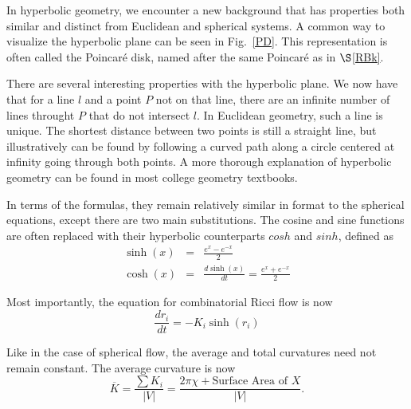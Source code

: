 \documentclass[12pt]{article}
\begin{document}
In hyperbolic geometry, we encounter a new background that has properties both similar and distinct from Euclidean and spherical systems. A common way to visualize the hyperbolic plane can be seen in Fig.~\ref{PD}. This representation is often called the Poincar\'{e} disk, named after the same Poincar\'{e} as in $\S$\ref{RBk}.\newline

\noindent There are several interesting properties with the hyperbolic plane. We now have that for a line $l$ and a point $P$ not on that line, there are an infinite number of lines throught $P$ that do not intersect $l$. In Euclidean geometry, such a line is unique. The shortest distance between two points is still a straight line, but illustratively can be found by following a curved path along a circle centered at infinity going through both points. A more thorough explanation of hyperbolic geometry can be found in most college geometry textbooks.\newline

\noindent In terms of the formulas, they remain relatively similar in format to the spherical equations, except there are two main substitutions. The cosine and sine functions are often replaced with their hyperbolic counterparts $cosh$ and $sinh$, defined as
\begin{eqnarray*}
\sinh(x) &=& \frac{e^x - e^{-x}}{2}\\
\cosh(x) &=& \frac{d\sinh(x)}{dt} = \frac{e^x + e^{-x}}{2}
\end{eqnarray*}

\noindent Most importantly, the equation for combinatorial Ricci flow is now
\begin{equation}
\label{HRiccif}
\frac{dr_i}{dt} = -K_i\sinh(r_i)
\end{equation}
\noindent 

\noindent Like in the case of spherical flow, the average and total curvatures need not remain constant. The average curvature is now
$$\overline{K} = \frac{\sum{K_i}}{|V|} = \frac{2\pi\chi + \mbox{Surface Area of }X}{|V|}.$$
\end{document}
